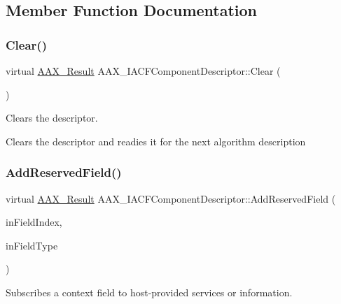 \subsection{Member Function Documentation}
\mbox{\label{a01625_ab93e4b968f3239326ac1046b64eab2f5}} 
\subsubsection{\texorpdfstring{Clear()}{Clear()}}
{\footnotesize\ttfamily virtual \mbox{\hyperlink{a00392_a4d8f69a697df7f70c3a8e9b8ee130d2f}{A\+A\+X\+\_\+\+Result}} A\+A\+X\+\_\+\+I\+A\+C\+F\+Component\+Descriptor\+::\+Clear (\begin{DoxyParamCaption}{ }\end{DoxyParamCaption})\hspace{0.3cm}{\ttfamily [pure virtual]}}



Clears the descriptor. 

Clears the descriptor and readies it for the next algorithm description \mbox{\label{a01625_aa81ce274471a76742e71d02bc3442253}} 
\subsubsection{\texorpdfstring{AddReservedField()}{AddReservedField()}}
{\footnotesize\ttfamily virtual \mbox{\hyperlink{a00392_a4d8f69a697df7f70c3a8e9b8ee130d2f}{A\+A\+X\+\_\+\+Result}} A\+A\+X\+\_\+\+I\+A\+C\+F\+Component\+Descriptor\+::\+Add\+Reserved\+Field (\begin{DoxyParamCaption}\item[{\mbox{\hyperlink{a00392_ae807f8986143820cfb5d6da32165c9c7}{A\+A\+X\+\_\+\+C\+Field\+Index}}}]{in\+Field\+Index,  }\item[{uint32\+\_\+t}]{in\+Field\+Type }\end{DoxyParamCaption})\hspace{0.3cm}{\ttfamily [pure virtual]}}



Subscribes a context field to host-\/provided services or information. 

